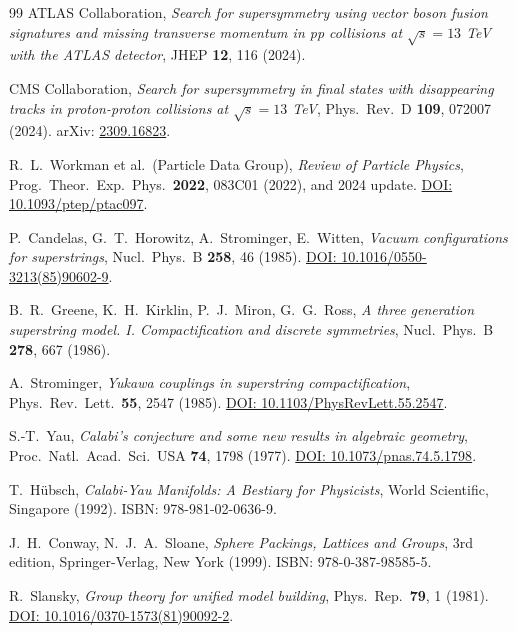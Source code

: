 \documentclass[11pt,a4paper]{article}
\theoremstyle{definition}
\begin{document}
\begin{thebibliography}{99}
ATLAS Collaboration,
\textit{Search for supersymmetry using vector boson fusion signatures and missing transverse momentum in pp collisions at $\sqrt{s} = 13$ TeV with the ATLAS detector},
JHEP \textbf{12}, 116 (2024).

CMS Collaboration,
\textit{Search for supersymmetry in final states with disappearing tracks in proton-proton collisions at $\sqrt{s} = 13$ TeV},
Phys.\ Rev.\ D \textbf{109}, 072007 (2024).
arXiv: \href{https://arxiv.org/abs/2309.16823}{2309.16823}.

R.~L.~Workman et al.\ (Particle Data Group),
\textit{Review of Particle Physics},
Prog.\ Theor.\ Exp.\ Phys.\ \textbf{2022}, 083C01 (2022),
and 2024 update.
\href{https://doi.org/10.1093/ptep/ptac097}{DOI: 10.1093/ptep/ptac097}.

P.~Candelas, G.~T.~Horowitz, A.~Strominger, E.~Witten,
\textit{Vacuum configurations for superstrings},
Nucl.\ Phys.\ B \textbf{258}, 46 (1985).
\href{https://doi.org/10.1016/0550-3213(85)90602-9}{DOI: 10.1016/0550-3213(85)90602-9}.

B.~R.~Greene, K.~H.~Kirklin, P.~J.~Miron, G.~G.~Ross,
\textit{A three generation superstring model. I. Compactification and discrete symmetries},
Nucl.\ Phys.\ B \textbf{278}, 667 (1986).

A.~Strominger,
\textit{Yukawa couplings in superstring compactification},
Phys.\ Rev.\ Lett.\ \textbf{55}, 2547 (1985).
\href{https://doi.org/10.1103/PhysRevLett.55.2547}{DOI: 10.1103/PhysRevLett.55.2547}.

S.-T.~Yau,
\textit{Calabi's conjecture and some new results in algebraic geometry},
Proc.\ Natl.\ Acad.\ Sci.\ USA \textbf{74}, 1798 (1977).
\href{https://doi.org/10.1073/pnas.74.5.1798}{DOI: 10.1073/pnas.74.5.1798}.

T.~H\"ubsch,
\textit{Calabi-Yau Manifolds: A Bestiary for Physicists},
World Scientific, Singapore (1992).
ISBN: 978-981-02-0636-9.

J.~H.~Conway, N.~J.~A.~Sloane,
\textit{Sphere Packings, Lattices and Groups},
3rd edition, Springer-Verlag, New York (1999).
ISBN: 978-0-387-98585-5.

R.~Slansky,
\textit{Group theory for unified model building},
Phys.\ Rep.\ \textbf{79}, 1 (1981).
\href{https://doi.org/10.1016/0370-1573(81)90092-2}{DOI: 10.1016/0370-1573(81)90092-2}.


\end{thebibliography}
\end{document}
